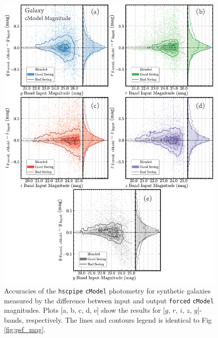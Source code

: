\documentclass[useamsfonts]{pasj01}
\def\cmodel{\texttt{cModel}}
\def\forced{\texttt{forced}}
\begin{document}
\begin{figure}
    \begin{center}
        \includegraphics[width=16cm]{fig/synpipe_galaxy_mag}
    \end{center}
    \caption{
        Accuracies of the \texttt{hscpipe} \cmodel{} photometry for synthetic
        galaxies measured by the difference between input and output \forced{}
        \cmodel{} magnitudes.
        Plots [a, b, c, d, e] show the results for [$g$, $r$, $i$, $z$, $y$]-bands, 
        respectively.
        The lines and contours legend is identical to Fig \ref{fig:psf_mag}.
        }
    \label{fig:cmodel_mag}
\end{figure}
\end{document}
